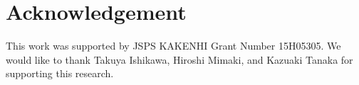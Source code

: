 \documentclass{sig-alternate-05-2015}
\begin{document}
\section{Acknowledgement}
This work was supported by JSPS KAKENHI Grant Number 15H05305.
We would like to thank Takuya Ishikawa, Hiroshi Mimaki, and Kazuaki Tanaka for supporting this research.


\end{document}
